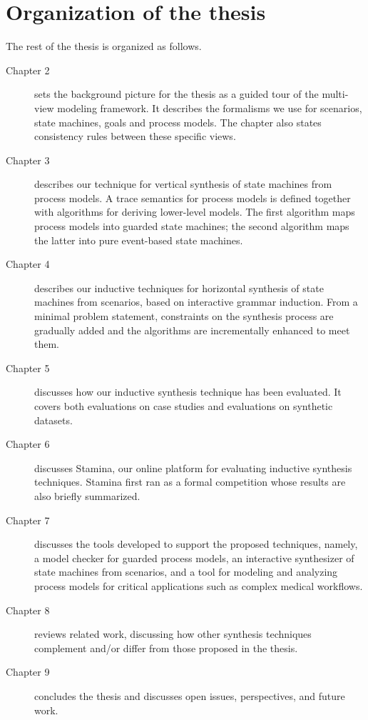 \section{Organization of the thesis\label{section:intro-organization}}

The rest of the thesis is organized as follows.
\begin{description}

\item[Chapter 2] sets the background picture for the thesis as a guided tour of the multi-view modeling framework. It describes the formalisms we use for scenarios, state machines, goals and process models. The chapter also states consistency rules between these specific views.

\item[Chapter 3] describes our technique for vertical synthesis of state machines from process models. A trace semantics for process models is defined together with algorithms for deriving lower-level models. The first algorithm maps process models into guarded state machines; the second algorithm maps the latter into pure event-based state machines.

\item[Chapter 4] describes our inductive techniques for horizontal synthesis of state machines from scenarios, based on interactive grammar induction. From a minimal problem statement, constraints on the synthesis process are gradually added and the algorithms are incrementally enhanced to meet them.

\item[Chapter 5] discusses how our inductive synthesis technique has been evaluated. It covers both evaluations on case studies and evaluations on synthetic datasets.

\item[Chapter 6] discusses Stamina, our online platform for evaluating inductive synthesis techniques. Stamina first ran as a formal competition whose results are also briefly summarized.

\item[Chapter 7] discusses the tools developed to support the proposed techniques, namely, a model checker for guarded process models, an interactive synthesizer of state machines from scenarios, and a tool for modeling and analyzing process models for critical applications such as complex medical workflows.

\item[Chapter 8] reviews related work, discussing how other synthesis techniques complement and/or differ from those proposed in the thesis.

\item[Chapter 9] concludes the thesis and discusses open issues, perspectives, and future work. 

\end{description}
